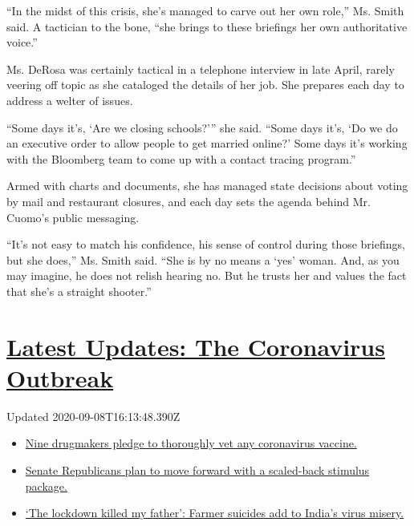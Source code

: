 ``In the midst of this crisis, she's managed to carve out her own
role,'' Ms. Smith said. A tactician to the bone, ``she brings to these
briefings her own authoritative voice.''

Ms. DeRosa was certainly tactical in a telephone interview in late
April, rarely veering off topic as she cataloged the details of her job.
She prepares each day to address a welter of issues.

``Some days it's, `Are we closing schools?''' she said. ``Some days
it's, `Do we do an executive order to allow people to get married
online?' Some days it's working with the Bloomberg team to come up with
a contact tracing program.''

Armed with charts and documents, she has managed state decisions about
voting by mail and restaurant closures, and each day sets the agenda
behind Mr. Cuomo's public messaging.

``It's not easy to match his confidence, his sense of control during
those briefings, but she does,'' Ms. Smith said. ``She is by no means a
`yes' woman. And, as you may imagine, he does not relish hearing no. But
he trusts her and values the fact that she's a straight shooter.''

\hypertarget{latest-updates-the-coronavirus-outbreak}{%
\section{\texorpdfstring{\href{https://www.nytimes3xbfgragh.onion/2020/09/08/world/covid-19-coronavirus.html?action=click\&pgtype=Article\&state=default\&region=MAIN_CONTENT_1\&context=storylines_live_updates}{Latest
Updates: The Coronavirus
Outbreak}}{Latest Updates: The Coronavirus Outbreak}}\label{latest-updates-the-coronavirus-outbreak}}

Updated 2020-09-08T16:13:48.390Z

\begin{itemize}
\tightlist
\item
  \href{https://www.nytimes3xbfgragh.onion/2020/09/08/world/covid-19-coronavirus.html?action=click\&pgtype=Article\&state=default\&region=MAIN_CONTENT_1\&context=storylines_live_updates\#link-679303d7}{Nine
  drugmakers pledge to thoroughly vet any coronavirus vaccine.}
\item
  \href{https://www.nytimes3xbfgragh.onion/2020/09/08/world/covid-19-coronavirus.html?action=click\&pgtype=Article\&state=default\&region=MAIN_CONTENT_1\&context=storylines_live_updates\#link-547feae1}{Senate
  Republicans plan to move forward with a scaled-back stimulus package.}
\item
  \href{https://www.nytimes3xbfgragh.onion/2020/09/08/world/covid-19-coronavirus.html?action=click\&pgtype=Article\&state=default\&region=MAIN_CONTENT_1\&context=storylines_live_updates\#link-1c973131}{`The
  lockdown killed my father': Farmer suicides add to India's virus
  misery.}
\end{itemize}

